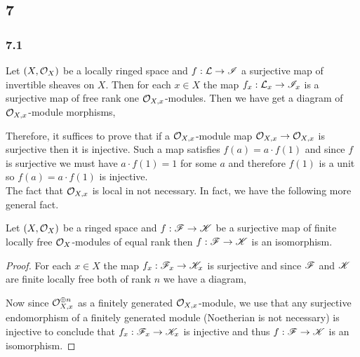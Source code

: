 \documentclass[12pt]{article}
\begin{document}
\subsection{7}

\subsubsection{7.1}

Let $(X, \mathcal{O}_{X})$ be a locally ringed space and $f : \mathcal{L} \to \mathscr{I}$ a surjective map of invertible sheaves on $X$. Then for each $x \in X$ the map $f_x : \mathcal{L}_x \to \mathscr{I}_x$ is a surjective map of free rank one $\mathcal{O}_{X, x}$-modules. Then we have get a diagram of $\mathcal{O}_{X, x}$-module morphisms,
\begin{center}
\end{center}
Therefore, it suffices to prove that if a $\mathcal{O}_{X, x}$-module map $\mathcal{O}_{X, x} \to \mathcal{O}_{X, x}$ is surjective then it is injective. Such a map satisfies $f(a) = a \cdot f(1)$ and since $f$ is surjective we must have $a \cdot f(1) = 1$ for some $a$ and therefore $f(1)$ is a unit so $f(a) = a \cdot f(1)$ is injective.
\bigskip\\
The fact that $\mathcal{O}_{X, x}$ is local in not necessary. In fact, we have the following more general fact.

\begin{theorem}
Let $(X, \mathcal{O}_{X})$ be a ringed space and $f : \mathscr{F} \to \mathscr{K}$ be a surjective map of finite locally free $\mathcal{O}_{X}$-modules of equal rank then $f : \mathscr{F} \to \mathscr{K}$ is an isomorphism. 
\end{theorem}

\begin{proof}
For each $x \in X$ the map $f_x : \mathscr{F}_x \to \mathscr{K}_x$ is surjective and since $\mathscr{F}$ and $\mathscr{K}$ are finite locally free both of rank $n$ we have a diagram,
\begin{center}
\end{center}
Now since $\mathcal{O}_{X, x}^{\oplus n}$ as a finitely generated $\mathcal{O}_{X, x}$-module,  we use that any surjective endomorphism of a finitely generated module (Noetherian is not necessary) is injective to conclude that $f_x : \mathscr{F}_x \to \mathscr{K}_x$ is injective and thus $f : \mathscr{F} \to \mathscr{K}$ is an isomorphism. 
\end{proof}
\end{document}

